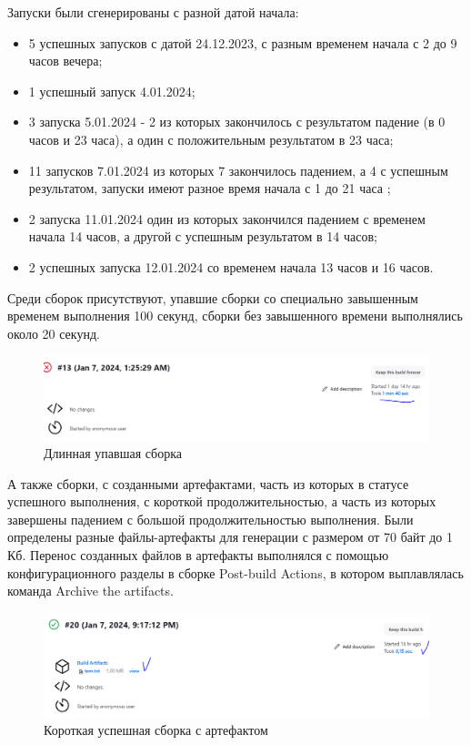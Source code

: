 Запуски были сгенерированы с разной датой начала:

\begin{itemize}
	\item 5 успешных запусков с датой 24.12.2023, с разным временем начала с 2 до 9 часов вечера;
	\item 1 успешный запуск 4.01.2024;
	\item 3 запуска 5.01.2024 - 2 из которых закончилось с результатом падение (в 0 часов и 23 часа), а один с положительным результатом в 23 часа;
	\item 11 запусков 7.01.2024 из которых 7 закончилось падением, а 4 с успешным результатом, запуски имеют разное время начала с 1 до 21 часа ;
	\item 2 запуска 11.01.2024 один из которых закончился падением с временем начала 14 часов, а другой с успешным результатом в 14 часов;
	\item 2 успешных запуска 12.01.2024 со временем начала 13 часов и 16 часов.
\end{itemize}


 Среди сборок присутствуют, упавшие сборки со специально завышенным временем выполнения 100 секунд, сборки без завышенного времени выполнялись около 20 секунд.
 
 \begin{figure}[ht!] 
	\center
	\includegraphics [scale=0.47] {my_folder/images//longBuild}
	\caption{Длинная упавшая сборка} 
	\label{fig:longBuild}  
\end{figure}


А также сборки, с созданными артефактами, часть из которых в статусе успешного выполнения, с короткой продолжительностью, а часть из которых завершены падением с большой продолжительностью выполнения. Были определены разные файлы-артефакты для генерации с размером от 70 байт до 1 Кб. Перенос созданных файлов в артефакты выполнялся с помощью конфигурационного разделы в сборке Post-build Actions, в котором выплавлялась команда Archive the artifacts.
 
 \begin{figure}[ht!] 
	\center
	\includegraphics [scale=0.47] {my_folder/images//artifactBuild}
	\caption{Короткая успешная сборка с артефактом} 
	\label{fig:artifactBuild}  
\end{figure}

